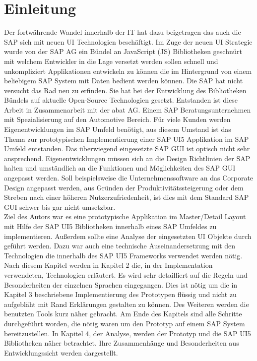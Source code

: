 \section{Einleitung}\label{einleitung}
Der fortwährende Wandel innerhalb der IT hat dazu beigetragen das auch die SAP sich mit neuen UI Technologien beschäftigt. Im Zuge der neuen UI Strategie wurde von der SAP AG ein Bündel an JavaScript (JS) Bibliotheken geschnürt mit welchem Entwickler in die Lage versetzt werden sollen schnell und unkompliziert Applikationen entwickeln zu können die im Hintergrund von einem beliebigem SAP System mit Daten bedient werden können. Die SAP hat nicht versucht das Rad neu zu erfinden. Sie hat bei der Entwicklung des Bibliotheken Bündels auf aktuelle Open-Source Technologien gesetzt. Entstanden ist diese Arbeit in Zusammenarbeit mit der abat AG. Einem SAP Beratungsunternehmen mit Spezialisierung auf den Automotive Bereich. Für viele Kunden werden Eigenentwicklungen im SAP Umfeld benötigt, aus diesem Umstand ist das Thema zur prototypischen Implementierung einer SAP UI5 Applikation im SAP Umfeld entstanden. Das überwiegend eingesetzte SAP GUI ist optisch nicht sehr ansprechend. Eigenentwicklungen müssen sich an die Design Richtlinien der SAP halten und umständlich an die Funktionen und Möglichkeiten des SAP GUI angepasst werden. Soll beispielsweise die Unternehmenssoftware an das Corporate Design angepasst werden, aus Gründen der Produktivitätssteigerung oder dem Streben nach einer höheren Nutzerzufriedenheit, ist dies mit dem Standard SAP GUI schwer bis gar nicht umsetzbar.\\
Ziel des Autors war es eine prototypische Applikation im Master/Detail Layout mit Hilfe der SAP UI5 Bibliotheken innerhalb eines SAP Umfeldes zu implementieren. Außerdem sollte eine Analyse der eingesetzten UI Objekte durch geführt werden. Dazu war auch eine technische Auseinandersetzung mit den Technologien die innerhalb des SAP UI5 Frameworks verwendet werden nötig.\\
Nach diesem Kapitel werden in Kapitel 2 die, in der Implementation verwendeten, Technologien erläutert. Es wird sehr detailliert auf die Regeln und Besonderheiten der einzelnen Sprachen eingegangen. Dies ist nötig um die in Kapitel 3 beschriebene Implementierung des Prototypen flüssig und nicht zu aufgebläht mit Rand Erklärungen gestalten zu können.  Des Weiteren werden die benutzten Tools kurz näher gebracht. Am Ende des Kapitels sind alle Schritte durchgeführt worden, die nötig waren um den Prototyp auf einem SAP System bereitzustellen. In Kapitel 4, der Analyse, werden der Prototyp und die SAP UI5 Bibliotheken näher betrachtet. Ihre Zusammenhänge und Besonderheiten aus Entwicklungssicht werden dargestellt.